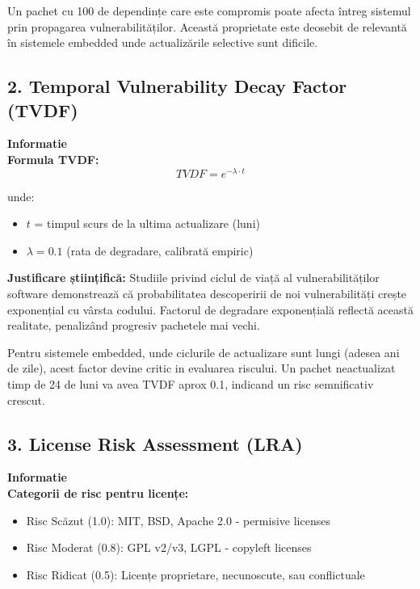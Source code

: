 \documentclass[12pt,a4paper]{article}
\newenvironment{infobox}{%
\begin{leftbar}
\color{black}
\textbf{Informatie}\\[0.5em]
}{%
\end{leftbar}
}
\begin{document}
Un pachet cu 100 de dependințe care este compromis poate afecta întreg sistemul prin propagarea vulnerabilităților. Această proprietate este deosebit de relevantă în sistemele embedded unde actualizările selective sunt dificile.

\subsection{2. Temporal Vulnerability Decay Factor (TVDF)}

\begin{infobox}
\textbf{Formula TVDF:}
\[TVDF = e^{-\lambda \cdot t}\]

unde:
\begin{itemize}
\item $t$ = timpul scurs de la ultima actualizare (luni)
\item $\lambda = 0.1$ (rata de degradare, calibrată empiric)
\end{itemize}
\end{infobox}

\textbf{Justificare științifică:} Studiile privind ciclul de viață al vulnerabilităților software demonstrează că probabilitatea descoperirii de noi vulnerabilități crește exponențial cu vârsta codului. Factorul de degradare exponențială reflectă această realitate, penalizând progresiv pachetele mai vechi.

Pentru sistemele embedded, unde ciclurile de actualizare sunt lungi (adesea ani de zile), acest factor devine critic in evaluarea riscului. Un pachet neactualizat timp de 24 de luni va avea TVDF aprox 0.1, indicand un risc semnificativ crescut.

\subsection{3. License Risk Assessment (LRA)}

\begin{infobox}
\textbf{Categorii de risc pentru licențe:}
\begin{itemize}
\item Risc Scăzut (1.0): MIT, BSD, Apache 2.0 - permisive licenses
\item Risc Moderat (0.8): GPL v2/v3, LGPL - copyleft licenses
\item Risc Ridicat (0.5): Licențe proprietare, necunoscute, sau conflictuale
\end{itemize}
\end{infobox}
\end{document}
